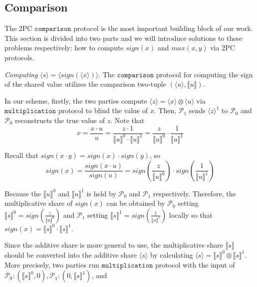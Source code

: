 \documentclass[letterpaper]{article} %
\begin{document}
    \subsection{Comparison}
    The 2PC $\mathtt{comparison}$ protocol is the most important building block of our work.
    This section is divided into two parts and we will introduce solutions to these problems respectively:
    how to compute $sign(x)$ and $max(x,y)$ via 2PC protocols.

    \emph{Computing} $\langle s\rangle  = \langle sign(\langle x\rangle)\rangle $.
    The $\mathtt{comparison}$ protocol for computing the sign of the shared value utilizes the comparison two-tuple $(\langle u\rangle,\llbracket u \rrbracket )$.

    In our scheme, firstly, the two parties compute $ \langle z\rangle = \langle x\rangle\otimes \langle u\rangle$ via $\mathtt{multiplication}$ protocol
    to blind the value of $x$.
    Then, $\mathcal{P}_{1}$ sends  $ \langle z\rangle^{1}$ to $\mathcal{P}_{0}$ and
    $\mathcal{P}_{0}$ reconstructs the true value of $z$.
    Note that
    $$x=\frac{x\cdot u}{u}
        =\frac{z\cdot 1}{\llbracket u \rrbracket^{0}\cdot \llbracket u \rrbracket^{1}}
        =\frac{z}{\llbracket u \rrbracket^{0}}\cdot\frac{1}{\llbracket u \rrbracket^{1}}$$

    Recall that $sign(x\cdot y)=sign(x)\cdot sign(y)$, so
    $$sign(x)=\frac{sign(x \cdot u)}{sign(u)}
    =sign(\frac{z}{\llbracket u \rrbracket^{0}})
    \cdot sign(\frac{1}{\llbracket u \rrbracket^{1}})$$



    Because the $\llbracket u \rrbracket^{0}$ and $\llbracket u \rrbracket^{1}$
    is held by $\mathcal{P}_{0}$ and $\mathcal{P}_{1}$ respectively.
    Therefore, the multiplicative share of $sign(x)$ can be obtained by
    $\mathcal{P}_{0}$ setting $\llbracket s \rrbracket^{0}
    =sign(\frac{z}{\llbracket u \rrbracket^{0}})$
    and $\mathcal{P}_{1}$ setting $\llbracket s \rrbracket^{1}
    =sign(\frac{1}{\llbracket u \rrbracket^{1}})$ locally
    so that $sign(x)=\llbracket s \rrbracket^{0}\cdot \llbracket s \rrbracket^{1}$.

    Since the additive share is more general to use,
    the multiplicative share $\llbracket s \rrbracket$ should be converted into the additive share $\langle s\rangle$
    by calculating $\langle s\rangle = \llbracket s \rrbracket ^{0}\otimes \llbracket s \rrbracket ^{1}$.
    More precisely, two parties run $\mathtt{multiplication}$ protocol with the input of
    $\mathcal{P}_{0}:(\llbracket s \rrbracket ^{0},0),\mathcal{P}_{1}:(0,\llbracket s \rrbracket ^{1})$, and
\end{document}
